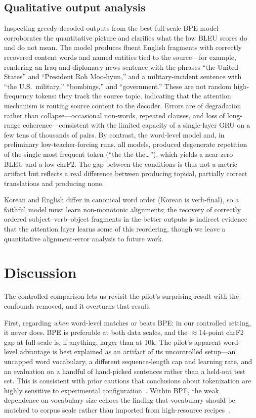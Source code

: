\documentclass[conference]{IEEEtran}
\begin{document}
\subsection{Qualitative output analysis}
Inspecting greedy-decoded outputs from the best full-scale BPE model corroborates
the quantitative picture and clarifies what the low BLEU scores do and do not
mean. The model produces fluent English fragments with correctly recovered
content words and named entities tied to the source---for example, rendering an
Iraq-and-diplomacy news sentence with the phrases ``the United States'' and
``President Roh Moo-hyun,'' and a military-incident sentence with ``the U.S.\
military,'' ``bombings,'' and ``government.'' These are not random high-frequency
tokens: they track the source topic, indicating that the attention mechanism is
routing source content to the decoder. Errors are of degradation rather than
collapse---occasional non-words, repeated clauses, and loss of long-range
coherence---consistent with the limited capacity of a single-layer GRU on a few
tens of thousands of pairs. By contrast, the word-level model and, in
preliminary low-teacher-forcing runs, all models, produced degenerate repetition
of the single most frequent token (``the the the\ldots''), which yields a near-zero
BLEU and a low chrF2. The gap between the conditions is thus not a metric artifact
but reflects a real difference between producing topical, partially correct
translations and producing none.

Korean and English differ in canonical word order (Korean is verb-final), so a
faithful model must learn non-monotonic alignments; the recovery of correctly
ordered subject--verb--object fragments in the better outputs is indirect
evidence that the attention layer learns some of this reordering, though we leave
a quantitative alignment-error analysis to future work.

\section{Discussion}
The controlled comparison lets us revisit the pilot's surprising result with the
confounds removed, and it overturns that result.

First, regarding \emph{when} word-level matches or beats BPE: in our controlled
setting, it never does. BPE is preferable at both data scales, and the
$\approx$14-point chrF2 gap at full scale is, if anything, larger than at 10k.
The pilot's apparent word-level advantage is best explained as an artifact of its
uncontrolled setup---an uncapped word vocabulary, a different sequence-length cap
and learning rate, and an evaluation on a handful of hand-picked sentences rather
than a held-out test set. This is consistent with prior cautions that conclusions
about tokenization are highly sensitive to experimental
configuration~\cite{gowda2020, sennrich2019}. Within BPE, the weak dependence on
vocabulary size echoes the finding that vocabulary should be matched to corpus
scale rather than imported from high-resource recipes~\cite{gowda2020}.
\end{document}
